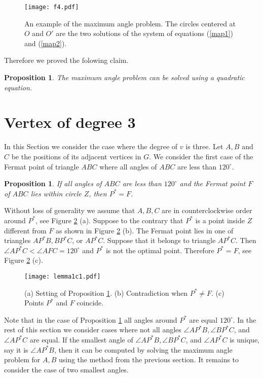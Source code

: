 \documentclass[10pt]{article}
\newtheorem{prop}[theorem]{Proposition}
\newenvironment{proof}{\begingroup\Proof}{\qed\endgroup}
\def\Proof{\noindent{\bf Proof\/:}\nobreak}
\def\qed{\unskip~{\vrule height 4pt depth 0pt width 4pt}\medbreak}
\begin{document}
\begin{figure}[htp]
\centering
\texttt{[image: f4.pdf]}
\caption{An example of the maximum angle problem. The circles centered at $O$ and $O'$ are the two solutions of the system of equations (\ref{map1}) and (\ref{map2}). }
\label{f4}
\end{figure}

Therefore we proved the folowing claim.
\begin{prop} \label{propdeg2a}
The maximum angle problem can be solved using a quadratic equation.
\end{prop}



\section{Vertex of degree 3}  \label{sectdeg3}

In this Section we consider the case where the degree of $v$ is three. 
Let $A,B$ and $C$ be the positions of its adjacent vertices in $G$.
We consider the first case of the Fermat point of triangle $ABC$ where all angles of $ABC$ are less than $120^{\circ}$.

\begin{prop} \label{prop2}
If all angles of $ABC$ are less than $120^{\circ}$ and 
the Fermat point $F$ of $ABC$ lies within circle $Z$, then $P^*=F$.
\end{prop}

\begin{proof}
Without loss of generality we assume that 
$A,B,C$ are in counterclockwise order around $P^*$, see Figure \ref{Fpoint} (a).
Suppose to the contrary that $P^*$ is a point inside $Z$ different from $F$ as shown in Figure \ref{Fpoint} (b).
The Fermat point lies in one of triangles $AP^*B,  BP^*C$,  or $AP^*C$.
Suppose that it belongs to triangle $AP^*C$. 
Then $\angle AP^*C < \angle AFC =120^{\circ}$ and $P^*$ is not the optimal point. 
Therefore $P^*=F$, see Figure \ref{Fpoint} (c).
\end{proof}

\begin{figure}[htp] 
\centering
\texttt{[image: lemma1c1.pdf]}
\caption{(a) Setting of Proposition \ref{prop2}. (b) Contradiction when $P^*\neq F$.  (c)  Points  $P^*$ and $F$ coincide.}
\label{Fpoint}
\end{figure}

Note that in the case of Proposition \ref{prop2} all angles around $P^*$ are equal 
$120^{\circ}$.  
In the rest of this section we consider cases where not all angles 
$\angle AP^*B,  \angle BP^*C$,  and $\angle AP^*C$ are equal. 
If the smallest angle of $\angle AP^*B,  \angle BP^*C$,  and $\angle AP^*C$
is unique, say it is $\angle AP^*B$, then it can be computed by solving the maximum angle problem for $A,B$ using the method from the previous section.
It remains to consider the case of two smallest angles.
\end{document}
